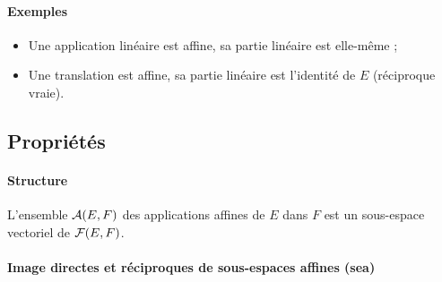 \paragraph{Exemples}
\begin{itemize}
    \item Une application linéaire est affine, sa partie linéaire est elle-même ;
    \item Une translation est affine, sa partie linéaire est l'identité de $E$
        (réciproque vraie).
\end{itemize}
\subsection{Propriétés}

\paragraph{Structure}
\begin{prop}
    L'ensemble $\mathcal{A}(E,F)$ des applications affines de $E$ dans $F$ est un
    sous-espace vectoriel de $\mathcal{F}(E,F)$.
\end{prop}

\paragraph{Image directes et réciproques de sous-espaces affines (sea)}
